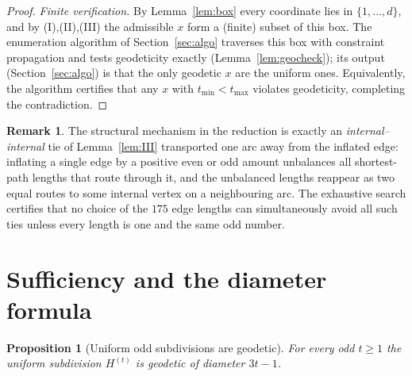 \documentclass{amsart}
\theoremstyle{plain}
\newtheorem{proposition}{Proposition}
\theoremstyle{definition}
\newtheorem{remark}{Remark}
\begin{document}
\begin{proof}
\emph{Finite verification.} By Lemma~\ref{lem:box} every coordinate lies in
$\{1,\dots,d\}$, and by (I),(II),(III) the admissible $x$ form a (finite) subset of
this box. The enumeration algorithm of Section~\ref{sec:algo} traverses this box
with constraint propagation and tests geodeticity exactly
(Lemma~\ref{lem:geocheck}); its output (Section~\ref{sec:algo}) is that the only
geodetic $x$ are the uniform ones. Equivalently, the algorithm certifies that any
$x$ with $t_{\min}<t_{\max}$ violates geodeticity, completing the contradiction.
\end{proof}

\begin{remark}
The structural mechanism in the reduction is exactly an \emph{internal--internal}
tie of Lemma~\ref{lem:III} transported one arc away from the inflated edge: inflating
a single edge by a positive even or odd amount unbalances all shortest-path lengths
that route through it, and the unbalanced lengths reappear as two equal routes to
some internal vertex on a neighbouring arc. The exhaustive search certifies that no
choice of the $175$ edge lengths can simultaneously avoid all such ties unless every
length is one and the same odd number.
\end{remark}

\section{Sufficiency and the diameter formula}\label{sec:suff}

\begin{proposition}[Uniform odd subdivisions are geodetic]\label{prop:suff}
For every odd $t\ge1$ the uniform subdivision $H^{(t)}$ is geodetic of diameter
$3t-1$.
\end{proposition}
\end{document}
